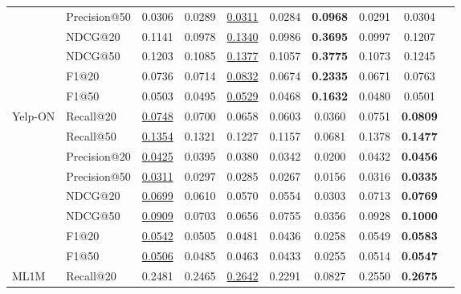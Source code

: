 \begin{table*}[]
{\begin{tabular}{@{}l|l|cccccc|cc@{}}
                        & Precision@50 & 0.0306       & 0.0289       & {\ul{0.0311}}    & 0.0284 & \textbf{0.0968} & 0.0291 & 0.0304          &  \\
                        & NDCG@20      & 0.1141       & 0.0978       & {\ul {0.1340}}    & 0.0986 & \textbf{0.3695} & 0.0997 & 0.1207          &  \\
                        & NDCG@50      & 0.1203       & 0.1085       & {\ul {0.1377}}    & 0.1057 & \textbf{0.3775} & 0.1073 & 0.1245          &  \\
                        & F1@20        & 0.0736       & 0.0714       & {\ul {0.0832}}    & 0.0674 & \textbf{0.2335} & 0.0671 & 0.0763          &  \\
                        & F1@50        & 0.0503       & 0.0495       & {\ul {0.0529}}    & 0.0468 & \textbf{0.1632} & 0.0480 & 0.0501          &  \\ \midrule
\multirow{8}{*}{Yelp-ON} & Recall@20    & {\ul {0.0748}} & 0.0700       & 0.0658          & 0.0603 & 0.0360          & 0.0751 & \textbf{0.0809} &  \\
                        & Recall@50    & {\ul {0.1354}} & 0.1321       & 0.1227          & 0.1157 & 0.0681          & 0.1378 & \textbf{0.1477} &  \\
                        & Precision@20 & {\ul {0.0425}} & 0.0395       & 0.0380          & 0.0342 & 0.0200          & 0.0432 & \textbf{0.0456} &  \\
                        & Precision@50 & {\ul {0.0311}} & 0.0297       & 0.0285          & 0.0267 & 0.0156          & 0.0316 & \textbf{0.0335} &  \\
                        & NDCG@20      & {\ul {0.0699}} & 0.0610       & 0.0570          & 0.0554 & 0.0303          & 0.0713 & \textbf{0.0769} &  \\
                        & NDCG@50      & {\ul {0.0909}} & 0.0703       & 0.0656          & 0.0755 & 0.0356          & 0.0928 & \textbf{0.1000} &  \\
                        & F1@20        & {\ul {0.0542}} & 0.0505       & 0.0481          & 0.0436 & 0.0258          & 0.0549 & \textbf{0.0583} &  \\
                        & F1@50        & {\ul {0.0506}} & 0.0485       & 0.0463          & 0.0433 & 0.0255          & 0.0514 & \textbf{0.0547} &  \\ \midrule
\multirow{8}{*}{ML1M}   & Recall@20    & 0.2481       & 0.2465       & {\ul {0.2642}}    & 0.2291 & 0.0827          & 0.2550 & \textbf{0.2675} &  \\

\end{tabular}}
\end{table*}
